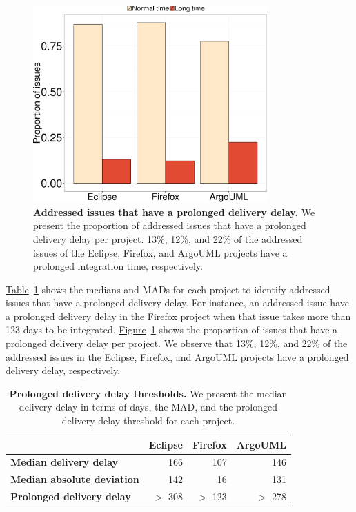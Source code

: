 \begin{figure}
	\centering
	\includegraphics[width=0.80\textwidth,keepaspectratio]
	{chapters/chapter4/figures/largelydelayed_issues_per_project.pdf}
	\caption{\textbf{Addressed issues that have a prolonged delivery delay.} We present
		the proportion of addressed issues that have a prolonged
		delivery delay per project. 13\%, 12\%, and 22\% of the addressed issues
		of the Eclipse, Firefox, and ArgoUML projects have a prolonged integration
	time, respectively.}
		\label{ch4:fig:largely_delayed_issues}
	\end{figure}

\hyperref[ch4:tbl:median_plus_mad]{Table}~\ref{ch4:tbl:median_plus_mad} shows
the medians and MADs for each project to identify addressed issues that have a
prolonged delivery delay. For instance, an addressed issue have a prolonged
delivery delay in the Firefox project when that issue takes more than 123 days
to be integrated.
\hyperref[ch4:fig:largely_delayed_issues]{Figure}~\ref{ch4:fig:largely_delayed_issues}
shows the proportion of issues that have a prolonged delivery delay per project.
We observe that 13\%, 12\%, and 22\% of the addressed issues in the Eclipse,
Firefox, and ArgoUML projects have a prolonged delivery delay, respectively. 

\begin{table}[t!]
	\footnotesize
	\centering
	\caption{\textbf{Prolonged delivery delay thresholds.} We present the median
	delivery delay in terms of days, the MAD, and the prolonged delivery delay threshold for each project.}
	\label{ch4:tbl:median_plus_mad}
	\begin{tabular}{lrrr}
		\cline{2-4} 
		\multicolumn{1}{c}{} & \textbf{Eclipse} & \textbf{Firefox} &
		\textbf{ArgoUML}\tabularnewline
		\hline 
		\textbf{Median delivery delay} & 166 & 107 & 146\tabularnewline
		\hline 
		\textbf{Median absolute deviation} & 142 & 16 & 131\tabularnewline
		\hline 
		\textbf{Prolonged delivery delay} & $>$ 308 & $>$ 123 & $>$ 278\tabularnewline
		\hline 
	\end{tabular}
\end{table}

